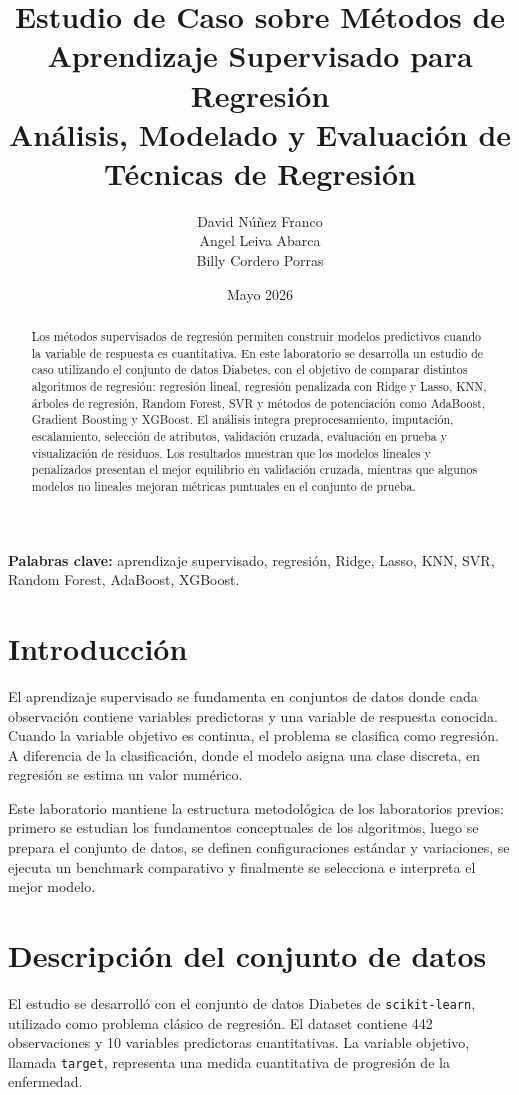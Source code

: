 \documentclass[12pt,letterpaper]{article}
\title{\textbf{Estudio de Caso sobre Métodos de Aprendizaje Supervisado para Regresión}\\
Análisis, Modelado y Evaluación de Técnicas de Regresión}
\author{David Núñez Franco \\ Angel Leiva Abarca \\ Billy Cordero Porras}
\date{Mayo 2026}
\begin{document}
\maketitle

\begin{abstract}
Los métodos supervisados de regresión permiten construir modelos predictivos cuando la variable de respuesta es cuantitativa. En este laboratorio se desarrolla un estudio de caso utilizando el conjunto de datos Diabetes, con el objetivo de comparar distintos algoritmos de regresión: regresión lineal, regresión penalizada con Ridge y Lasso, KNN, árboles de regresión, Random Forest, SVR y métodos de potenciación como AdaBoost, Gradient Boosting y XGBoost. El análisis integra preprocesamiento, imputación, escalamiento, selección de atributos, validación cruzada, evaluación en prueba y visualización de residuos. Los resultados muestran que los modelos lineales y penalizados presentan el mejor equilibrio en validación cruzada, mientras que algunos modelos no lineales mejoran métricas puntuales en el conjunto de prueba. 
\end{abstract}

\textbf{Palabras clave:} aprendizaje supervisado, regresión, Ridge, Lasso, KNN, SVR, Random Forest, AdaBoost, XGBoost.

\section{Introducción}
El aprendizaje supervisado se fundamenta en conjuntos de datos donde cada observación contiene variables predictoras y una variable de respuesta conocida. Cuando la variable objetivo es continua, el problema se clasifica como regresión. A diferencia de la clasificación, donde el modelo asigna una clase discreta, en regresión se estima un valor numérico.

Este laboratorio mantiene la estructura metodológica de los laboratorios previos: primero se estudian los fundamentos conceptuales de los algoritmos, luego se prepara el conjunto de datos, se definen configuraciones estándar y variaciones, se ejecuta un benchmark comparativo y finalmente se selecciona e interpreta el mejor modelo.

\section{Descripción del conjunto de datos}
El estudio se desarrolló con el conjunto de datos Diabetes de \texttt{scikit-learn}, utilizado como problema clásico de regresión. El dataset contiene 442 observaciones y 10 variables predictoras cuantitativas. La variable objetivo, llamada \texttt{target}, representa una medida cuantitativa de progresión de la enfermedad.
\end{document}
